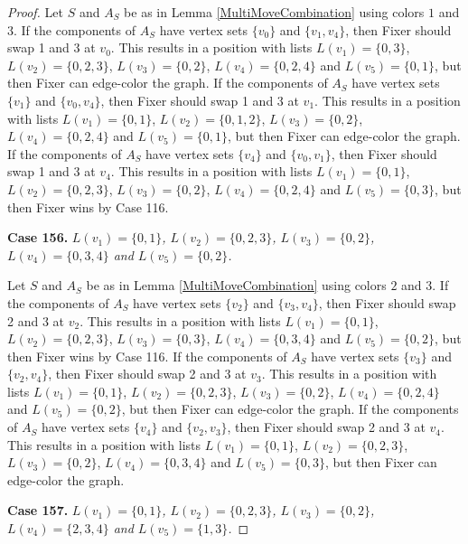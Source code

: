 \documentclass[12pt]{amsart}
\theoremstyle{plain}
\theoremstyle{definition}
\theoremstyle{remark}
\begin{document}
\begin{proof}
Let $S$ and $A_S$ be as in Lemma \ref{MultiMoveCombination} using colors $1$ and $3$. If the components of $A_S$ have vertex sets $\{v_0\}$ and $\{v_1, v_4\}$, then Fixer should swap 1 and 3 at $v_0$. This results in a position with lists $L(v_1) = \{0, 3\}$, $L(v_2) = \{0, 2, 3\}$, $L(v_3) = \{0, 2\}$, $L(v_4) = \{0, 2, 4\}$ and $L(v_5) = \{0, 1\}$, but then Fixer can edge-color the graph.
If the components of $A_S$ have vertex sets $\{v_1\}$ and $\{v_0, v_4\}$, then Fixer should swap 1 and 3 at $v_1$. This results in a position with lists $L(v_1) = \{0, 1\}$, $L(v_2) = \{0, 1, 2\}$, $L(v_3) = \{0, 2\}$, $L(v_4) = \{0, 2, 4\}$ and $L(v_5) = \{0, 1\}$, but then Fixer can edge-color the graph.
If the components of $A_S$ have vertex sets $\{v_4\}$ and $\{v_0, v_1\}$, then Fixer should swap 1 and 3 at $v_4$. This results in a position with lists $L(v_1) = \{0, 1\}$, $L(v_2) = \{0, 2, 3\}$, $L(v_3) = \{0, 2\}$, $L(v_4) = \{0, 2, 4\}$ and $L(v_5) = \{0, 3\}$, but then Fixer wins by Case 116.

\noindent\textbf{Case 156.  }\textit{$L(v_1) = \{0, 1\}$, $L(v_2) = \{0, 2, 3\}$, $L(v_3) = \{0, 2\}$, $L(v_4) = \{0, 3, 4\}$ and $L(v_5) = \{0, 2\}$.}

Let $S$ and $A_S$ be as in Lemma \ref{MultiMoveCombination} using colors $2$ and $3$. If the components of $A_S$ have vertex sets $\{v_2\}$ and $\{v_3, v_4\}$, then Fixer should swap 2 and 3 at $v_2$. This results in a position with lists $L(v_1) = \{0, 1\}$, $L(v_2) = \{0, 2, 3\}$, $L(v_3) = \{0, 3\}$, $L(v_4) = \{0, 3, 4\}$ and $L(v_5) = \{0, 2\}$, but then Fixer wins by Case 116.
If the components of $A_S$ have vertex sets $\{v_3\}$ and $\{v_2, v_4\}$, then Fixer should swap 2 and 3 at $v_3$. This results in a position with lists $L(v_1) = \{0, 1\}$, $L(v_2) = \{0, 2, 3\}$, $L(v_3) = \{0, 2\}$, $L(v_4) = \{0, 2, 4\}$ and $L(v_5) = \{0, 2\}$, but then Fixer can edge-color the graph.
If the components of $A_S$ have vertex sets $\{v_4\}$ and $\{v_2, v_3\}$, then Fixer should swap 2 and 3 at $v_4$. This results in a position with lists $L(v_1) = \{0, 1\}$, $L(v_2) = \{0, 2, 3\}$, $L(v_3) = \{0, 2\}$, $L(v_4) = \{0, 3, 4\}$ and $L(v_5) = \{0, 3\}$, but then Fixer can edge-color the graph.

\noindent\textbf{Case 157.  }\textit{$L(v_1) = \{0, 1\}$, $L(v_2) = \{0, 2, 3\}$, $L(v_3) = \{0, 2\}$, $L(v_4) = \{2, 3, 4\}$ and $L(v_5) = \{1, 3\}$.}


\end{proof}
\end{document}
